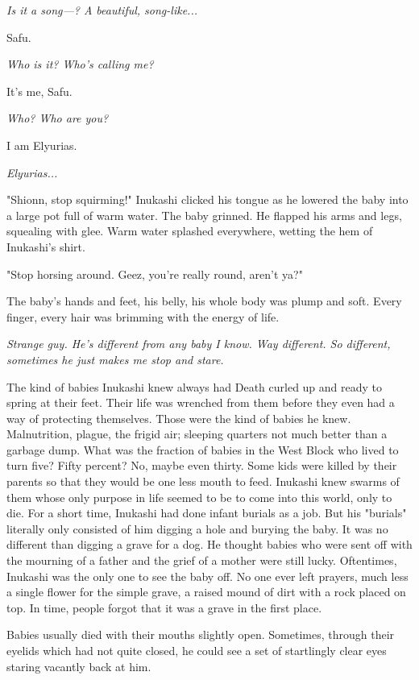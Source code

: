 \emph{Is it a song---? A beautiful, song-like...}

Safu.

\emph{Who is it? Who's calling me?}

It's me, Safu.

\emph{Who? Who are you?}

I am Elyurias.

\emph{Elyurias...}

\mybreak

"Shionn, stop squirming!" Inukashi clicked his tongue as he lowered the
baby into a large pot full of warm water. The baby grinned. He flapped
his arms and legs, squealing with glee. Warm water splashed everywhere,
wetting the hem of Inukashi's shirt.

"Stop horsing around. Geez, you're really round, aren't ya?"

The baby's hands and feet, his belly, his whole body was plump and soft.
Every finger, every hair was brimming with the energy of life.

\emph{Strange guy. He's different from any baby I know. Way different. So
different, sometimes he just makes me stop and stare.}

The kind of babies Inukashi knew always had Death curled up and ready to
spring at their feet. Their life was wrenched from them before they even
had a way of protecting themselves. Those were the kind of babies he
knew. Malnutrition, plague, the frigid air; sleeping quarters not much
better than a garbage dump. What was the fraction of babies in the West
Block who lived to turn five? Fifty percent? No, maybe even thirty. Some
kids were killed by their parents so that they would be one less mouth
to feed. Inukashi knew swarms of them whose only purpose in life seemed
to be to come into this world, only to die. For a short time, Inukashi
had done infant burials as a job. But his "burials" literally only
consisted of him digging a hole and burying the baby. It was no
different than digging a grave for a dog. He thought babies who were
sent off with the mourning of a father and the grief of a mother were
still lucky. Oftentimes, Inukashi was the only one to see the baby off.
No one ever left prayers, much less a single flower for the simple
grave, a raised mound of dirt with a rock placed on top. In time, people
forgot that it was a grave in the first place.

Babies usually died with their mouths slightly open. Sometimes, through
their eyelids which had not quite closed, he could see a set of
startlingly clear eyes staring vacantly back at him.

